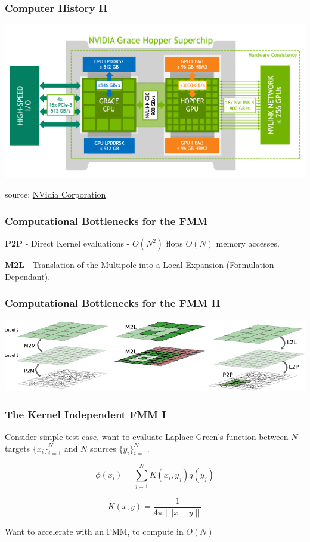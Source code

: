 \begin{frame}
    \frametitle{Computer History II}

    \includegraphics[width=\linewidth]{assets/grace_hopper.png}

   source:  \href{https://developer.nvidia.com/blog/nvidia-grace-hopper-superchip-architecture-in-depth/}{NVidia Corporation}
\end{frame}


\begin{frame}
    \frametitle{Computational Bottlenecks for the FMM}

    \begin{list}{-}{}

        \item \textbf{P2P} - Direct Kernel evaluations - $O(N^2)$ flops $O(N)$ memory accesses.
        \item \textbf{M2L} - Translation of the Multipole into a Local Expansion (Formulation Dependant).
    \end{list}

\end{frame}

\begin{frame}
    \frametitle{Computational Bottlenecks for the FMM II}

    \includegraphics[width=\linewidth]{assets/algorithm.pdf}

\end{frame}


\begin{frame}
    \frametitle{The Kernel Independent FMM I}


    Consider simple test case, want to evaluate Laplace Green's function between $N$ targets $\{x_i\}_{i=1}^N$ and $N$ sources $\{y_i\}_{i=1}^N$.

    \begin{equation}
        \phi(x_i) = \sum_{j=1}^N K(x_i, y_j) q(y_j)
        \label{eq:sec:introduction:potential}
    \end{equation}

    $$ K(x, y) = \frac{1}{4\pi \||x-y\|}$$

    Want to accelerate with an FMM, to compute in $O(N)$
\end{frame}

